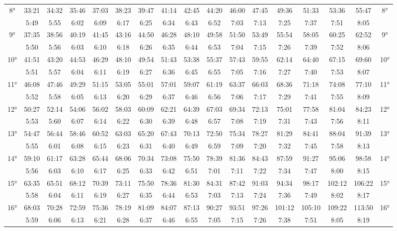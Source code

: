 \begin{scriptsize}
\begin{tabular}{c || c | c | c | c | c | c | c | c | c | c | c | c | c | c | c || c}
		\multirow{2}{*}{8°}&33:21&34:32&35:46&37:03&38:23&39:47&41:14&42:45&44:20&46:00&47:45&49:36&51:33&53:36&55:47&\multirow{2}{*}{8°}\\ \space&5:49&5:55&6:02&6:09&6:17&6:25&6:34&6:43&6:52&7:03&7:13&7:25&7:37&7:51&8:05&\space\\\hline
		\multirow{2}{*}{9°}&37:35&38:56&40:19&41:45&43:16&44:50&46:28&48:10&49:58&51:50&53:49&55:54&58:05&60:25&62:52&\multirow{2}{*}{9°}\\ \space&5:50&5:56&6:03&6:10&6:18&6:26&6:35&6:44&6:53&7:04&7:15&7:26&7:39&7:52&8:06&\space\\\hline
		\multirow{2}{*}{10°}&41:51&43:20&44:53&46:29&48:10&49:54&51:43&53:38&55:37&57:43&59:55&62:14&64:40&67:15&69:60&\multirow{2}{*}{10°}\\ \space&5:51&5:57&6:04&6:11&6:19&6:27&6:36&6:45&6:55&7:05&7:16&7:27&7:40&7:53&8:07&\space\\\hline
		\multirow{2}{*}{11°}&46:08&47:46&49:29&51:15&53:05&55:01&57:01&59:07&61:19&63:37&66:03&68:36&71:18&74:08&77:10&\multirow{2}{*}{11°}\\ \space&5:52&5:58&6:05&6:13&6:20&6:29&6:37&6:46&6:56&7:06&7:17&7:29&7:41&7:55&8:09&\space\\\hline
		\multirow{2}{*}{12°}&50:27&52:14&54:06&56:02&58:03&60:09&62:21&64:39&67:03&69:34&72:13&75:01&77:58&81:04&84:23&\multirow{2}{*}{12°}\\ \space&5:53&5:60&6:07&6:14&6:22&6:30&6:39&6:48&6:57&7:08&7:19&7:31&7:43&7:56&8:11&\space\\\hline
		\multirow{2}{*}{13°}&54:47&56:44&58:46&60:52&63:03&65:20&67:43&70:13&72:50&75:34&78:27&81:29&84:41&88:04&91:39&\multirow{2}{*}{13°}\\ \space&5:55&6:01&6:08&6:15&6:23&6:31&6:40&6:49&6:59&7:09&7:20&7:32&7:45&7:58&8:13&\space\\\hline
		\multirow{2}{*}{14°}&59:10&61:17&63:28&65:44&68:06&70:34&73:08&75:50&78:39&81:36&84:43&87:59&91:27&95:06&98:58&\multirow{2}{*}{14°}\\ \space&5:56&6:03&6:10&6:17&6:25&6:33&6:42&6:51&7:01&7:11&7:22&7:34&7:47&8:00&8:15&\space\\\hline
		\multirow{2}{*}{15°}&63:35&65:51&68:12&70:39&73:11&75:50&78:36&81:30&84:31&87:42&91:03&94:34&98:17&102:12&106:22&\multirow{2}{*}{15°}\\ \space&5:58&6:04&6:11&6:19&6:27&6:35&6:44&6:53&7:03&7:13&7:24&7:36&7:49&8:02&8:17&\space\\\hline
		\multirow{2}{*}{16°}&68:03&70:28&72:59&75:36&78:19&81:09&84:07&87:13&90:27&93:51&97:26&101:12&105:10&109:22&113:50&\multirow{2}{*}{16°}\\ \space&5:59&6:06&6:13&6:21&6:28&6:37&6:46&6:55&7:05&7:15&7:26&7:38&7:51&8:05&8:19&\space\\\hline

\end{tabular}
\end{scriptsize}
